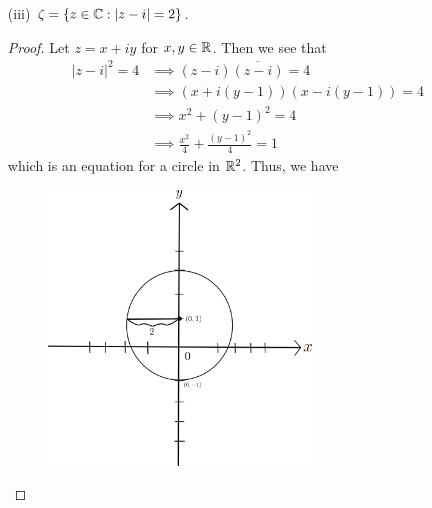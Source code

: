 \documentclass[a4paper]{article}
\begin{document}
\begin{enumerate}
\begin{solution}
            \end{solution}
        \item[(iii)] \( \zeta = \{ z \in \mathbb{C} : | z - i  |  = 2  \}  \).
            \begin{proof}
            Let \( z = x + iy  \) for \( x,y \in \mathbb{R}  \). Then we see that 
            \begin{align*}
                | z - i  |^{2} = 4 &\implies (z - i) \overline{(z - i)} = 4 \\
                                   &\implies (x + i(y-1))(x - i(y-1)) = 4 \\
                                   &\implies x^{2} + (y-1)^{2} = 4 \\
                                   &\implies \frac{ x^{2} }{ 4 } + \frac{ (y-1)^{2} }{ 4 }  = 1
            \end{align*}
            which is an equation for a circle in \( \mathbb{R}^{2} \). Thus, we have
                \begin{figure}[H]
                    \centering
                    \includegraphics[width=7cm]{figures/problem7part3.png}
                    \label{fig:my_label}
                \end{figure}
            \end{proof}
    \end{enumerate}
\end{document}
